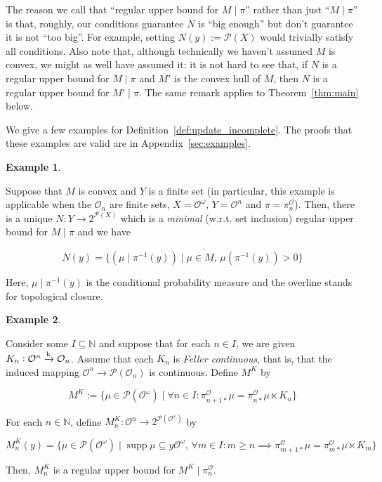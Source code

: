 \documentclass[11pt]{article}
\theoremstyle{definition}
\newtheorem{example}{Example}%
\theoremstyle{plain}
\newcommand{\Nats}{\mathbb{N}}
\newcommand{\M}{\xrightarrow{\textnormal{k}}}
\newcommand{\PM}{\mathcal{P}}
\DeclareMathOperator{\Sp}{supp}
\newcommand{\Ob}{\mathcal{O}}
\newcommand{\OO}{\Ob^\omega}
\newcommand{\PO}{\pi^\Ob}
\newcommand{\PMO}{\PM(\OO)}
\begin{document}
The reason we call that \enquote{regular upper bound for $M\mid\pi$} rather than just \enquote{$M\mid\pi$} is that, roughly, our conditions guarantee $N$ is \enquote{big enough} but don't guarantee it is not \enquote{too big}. For example, setting $N(y):=\PM(X)$ would trivially satisfy all conditions. Also note that, although technically we haven't assumed $M$ is convex, we might as well have assumed it: it is not hard to see that, if $N$ is a regular upper bound for $M \mid \pi$ and $M'$ is the convex hull of $M$, then $N$ is a regular upper bound for $M' \mid \pi$. The same remark applies to Theorem~\ref{thm:main} below.

We give a few examples for Definition~\ref{def:update_incomplete}. The proofs that these examples are valid are in Appendix~\ref{sec:examples}.

\begin{samepage}
\begin{example}
\label{exm:update_incomplete_finite}

Suppose that $M$ is convex and $Y$ is a finite set (in particular, this example is applicable when the $\Ob_n$ are finite sets, $X=\OO$, $Y=\Ob^n$ and $\pi=\PO_n$). Then, there is a unique $N: Y \rightarrow 2^{\PM(X)}$ which is a \emph{minimal} (w.r.t. set inclusion) regular upper bound for $M \mid \pi$ and we have

\begin{equation}
\label{eqn:exm__update_incomplete_finite}
N(y) = \overline{\{\left(\mu \mid \pi^{-1}(y)\right) \mid \mu \in M,\, \mu\left(\pi^{-1}(y)\right) > 0\}}
\end{equation}

Here, $\mu \mid \pi^{-1}(y)$ is the conditional probability measure and the overline stands for topological closure.

\end{example}
\end{samepage}
%
\begin{samepage}
\begin{example}
\label{exm:update_incomplete_kernels}

Consider some $I \subseteq \Nats$ and suppose that for each $n \in I$, we are given $K_n: \Ob^n \M \Ob_n$. Assume that each $K_n$ is \emph{Feller continuous}, that is, that the induced mapping $\Ob^n \rightarrow \PM\left(\Ob_n\right)$ is continuous. Define $M^K$ by

\begin{equation}
M^K:=\{\mu \in \PMO \mid \forall n \in I: \PO_{n+1*}\mu = \PO_{n*}\mu \ltimes K_n\}
\end{equation}

For each $n \in \Nats$, define $M^K_n: \Ob^n \rightarrow 2^{\PMO}$ by

\begin{equation}
M^K_n(y) = \{\mu \in \PMO \mid \Sp{\mu} \subseteq y\OO,\, \forall m \in I: m \geq n \implies \PO_{m+1*}\mu = \PO_{m*}\mu \ltimes K_m\}
\end{equation}

Then, $M^K_n$ is a regular upper bound for $M^K \mid \PO_n$.

\end{example}
\end{samepage}
\end{document}
